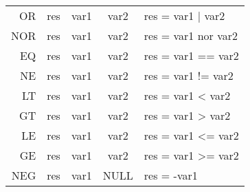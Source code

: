 \documentclass[10pt, a4paper]{article}
\begin{document}
\begin{center}
{\begin{longtable}{|r|c|c|c|l|}
             OR     &  res      &  var1    &  var2    &   res = var1 | var2 \\
            NOR     &  res      &  var1    &  var2    &   res = var1 nor var2 \\
             EQ     &  res      &  var1    &  var2    &   res = var1 == var2 \\
             NE     &  res      &  var1    &  var2    &   res = var1 != var2 \\
             LT     &  res      &  var1    &  var2    &   res = var1 < var2 \\
             GT     &  res      &  var1    &  var2    &   res = var1 > var2 \\
             LE     &  res      &  var1    &  var2    &   res = var1 <= var2 \\
             GE     &  res      &  var1    &  var2    &   res = var1 >= var2 \\
            NEG     &  res      &  var1    &  NULL    &   res = -var1 \\
        \end{longtable}
    }
\end{center}
\end{document}
